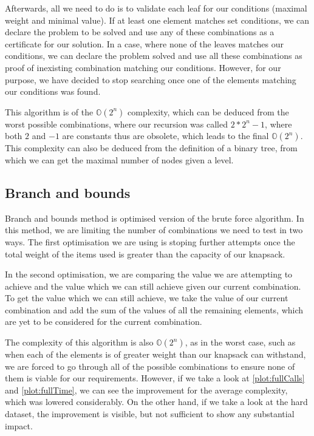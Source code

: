 \newpage
Afterwards, all we need to do is to validate each leaf for our conditions (maximal weight and minimal value). If at least one element matches set conditions, we can declare the problem to be solved and use any of these combinations as a certificate for our solution. In a case, where none of the leaves matches our conditions, we can declare the problem solved and use all these combinations as proof of inexisting combination matching our conditions. However, for our purpose, we have decided to stop searching once one of the elements matching our conditions was found.

This algorithm is of the $\mathbb{O}(2^n)$ complexity, which can be deduced from the worst possible combinations, where our recursion was called $2*2^n-1$, where both $2$ and $-1$ are constants thus are obsolete, which leads to the final $\mathbb{O}(2^n)$.  This complexity can also be deduced from the definition of a binary tree, from which we can get the maximal number of nodes given a level.

\subsection{Branch and bounds}
Branch and bounds method is optimised version of the brute force algorithm. In this method, we are limiting the number of combinations we need to test in two ways. The first optimisation we are using is stoping further attempts once the total weight of the items used is greater than the capacity of our knapsack.

In the second optimisation, we are comparing the value we are attempting to achieve and the value which we can still achieve given our current combination. To get the value which we can still achieve, we take the value of our current combination and add the sum of the values of all the remaining elements, which are yet to be considered for the current combination.

The complexity of this algorithm is also $\mathbb{O}(2^n)$, as in the worst case, such as when each of the elements is of greater weight than our knapsack can withstand, we are forced to go through all of the possible combinations to ensure none of them is viable for our requirements. However, if we take a look at \cref{plot:fullCalls} and \cref{plot:fullTime}, we can see the improvement for the average complexity, which was lowered considerably. On the other hand, if we take a look at the hard dataset, the improvement is visible, but not sufficient to show any substantial impact.

